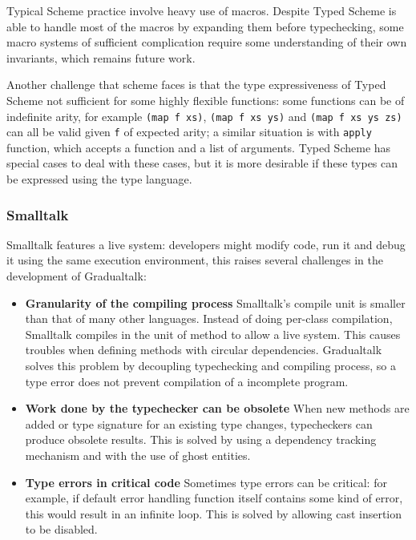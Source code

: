 Typical Scheme practice involve heavy use of macros.
Despite Typed Scheme is able to handle most of the macros by expanding them before typechecking,
some macro systems of sufficient complication require some understanding of their own invariants,
which remains future work.

Another challenge that scheme faces is that the type expressiveness of Typed Scheme
not sufficient for some highly flexible functions:
some functions can be of indefinite arity, for example \texttt{(map f xs)}, \texttt{(map f xs ys)}
and \texttt{(map f xs ys zs)} can all be valid given \texttt{f} of expected arity;
a similar situation is with \texttt{apply} function, which accepts a function and a list of arguments.
Typed Scheme has special cases to deal with these cases, but it is more desirable
if these types can be expressed using the type language.

\subsubsection{Smalltalk}

Smalltalk features a live system: developers might modify code, run it and debug it using the same execution environment, this raises several challenges in the development of Gradualtalk:

\begin{itemize}
	\item \textbf{Granularity of the compiling process}
	Smalltalk's compile unit is smaller than that of many other languages.
	Instead of doing per-class compilation, Smalltalk compiles in the unit of method to
	allow a live system. This causes troubles when defining methods with circular dependencies.
	Gradualtalk solves this problem by decoupling typechecking and compiling process,
	so a type error does not prevent compilation of a incomplete program.
	\item \textbf{Work done by the typechecker can be obsolete}
	When new methods are added or type signature for an existing type changes,
	typecheckers can produce obsolete results. This is solved by using a dependency tracking
	mechanism and with the use of ghost entities.
	\item \textbf{Type errors in critical code} Sometimes type errors can be critical:
	for example, if default error handling function itself contains some kind of error,
	this would result in an infinite loop. This is solved by allowing cast insertion
	to be disabled.
\end{itemize}

